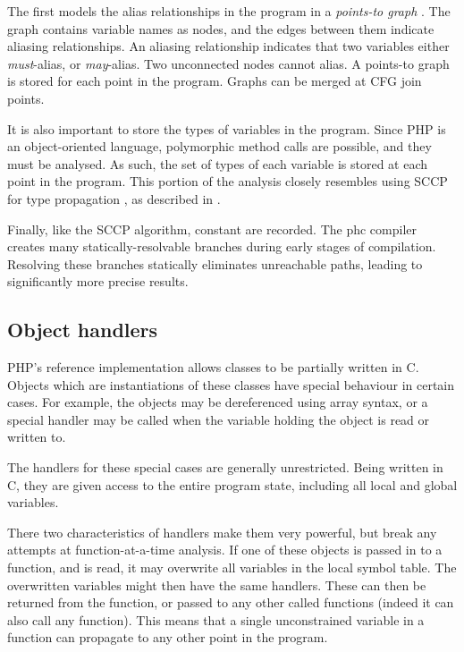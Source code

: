{The first models the alias relationships in the program in a \textit{points-to graph} \cite{emami}.
The graph contains variable names as nodes, and the edges between them indicate aliasing relationships.
An aliasing relationship indicates that two variables either \textit{must}-alias, or \textit{may}-alias.
Two unconnected nodes cannot alias.
A points-to graph is stored for each point in the program.
Graphs can be merged at CFG join points.

It is also important to store the types of variables in the program.
Since PHP is an object-oriented language, polymorphic method calls are possible, and they must be analysed.
As such, the set of types of each variable is stored at each point in the program.
This portion of the analysis closely resembles using SCCP for type propagation \cite{lenartsadler}, as described in .

Finally, like the SCCP algorithm, constant are recorded.
The phc compiler creates many statically-resolvable branches during early stages of compilation.
Resolving these branches statically eliminates unreachable paths, leading to significantly more precise results.



\subsection{Object handlers}

PHP's reference implementation allows classes to be partially written in C.
Objects which are instantiations of these classes have special behaviour in certain cases.
For example, the objects may be dereferenced using array syntax, or a special handler may be called when the variable holding the object is read or written to.

The handlers for these special cases are generally unrestricted.
Being written in C, they are given access to the entire program state, including all local and global variables.

There two characteristics of handlers make them very powerful, but break any attempts at function-at-a-time analysis.
If one of these objects is passed in to a function, and is read, it may overwrite all variables in the local symbol table.
The overwritten variables might then have the same handlers.
These can then be returned from the function, or passed to any other called functions (indeed it can also call any function).
This means that a single unconstrained variable in a function can propagate to any other point in the program.


}
